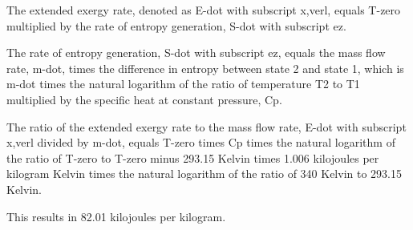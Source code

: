 The extended exergy rate, denoted as E-dot with subscript x,verl, equals T-zero multiplied by the rate of entropy generation, S-dot with subscript ez.

The rate of entropy generation, S-dot with subscript ez, equals the mass flow rate, m-dot, times the difference in entropy between state 2 and state 1, which is m-dot times the natural logarithm of the ratio of temperature T2 to T1 multiplied by the specific heat at constant pressure, Cp.

The ratio of the extended exergy rate to the mass flow rate, E-dot with subscript x,verl divided by m-dot, equals T-zero times Cp times the natural logarithm of the ratio of T-zero to T-zero minus 293.15 Kelvin times 1.006 kilojoules per kilogram Kelvin times the natural logarithm of the ratio of 340 Kelvin to 293.15 Kelvin.

This results in 82.01 kilojoules per kilogram.